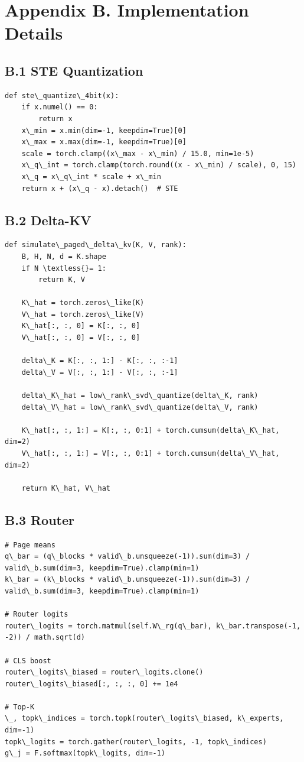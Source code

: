 \section{Appendix B. Implementation Details}

\subsection{B.1 STE Quantization}

\begin{lstlisting}
def ste\_quantize\_4bit(x):
    if x.numel() == 0:
        return x
    x\_min = x.min(dim=-1, keepdim=True)[0]
    x\_max = x.max(dim=-1, keepdim=True)[0]
    scale = torch.clamp((x\_max - x\_min) / 15.0, min=1e-5)
    x\_q\_int = torch.clamp(torch.round((x - x\_min) / scale), 0, 15)
    x\_q = x\_q\_int * scale + x\_min
    return x + (x\_q - x).detach()  # STE
\end{lstlisting}

\subsection{B.2 Delta-KV}

\begin{lstlisting}
def simulate\_paged\_delta\_kv(K, V, rank):
    B, H, N, d = K.shape
    if N \textless{}= 1:
        return K, V
    
    K\_hat = torch.zeros\_like(K)
    V\_hat = torch.zeros\_like(V)
    K\_hat[:, :, 0] = K[:, :, 0]
    V\_hat[:, :, 0] = V[:, :, 0]
    
    delta\_K = K[:, :, 1:] - K[:, :, :-1]
    delta\_V = V[:, :, 1:] - V[:, :, :-1]
    
    delta\_K\_hat = low\_rank\_svd\_quantize(delta\_K, rank)
    delta\_V\_hat = low\_rank\_svd\_quantize(delta\_V, rank)
    
    K\_hat[:, :, 1:] = K[:, :, 0:1] + torch.cumsum(delta\_K\_hat, dim=2)
    V\_hat[:, :, 1:] = V[:, :, 0:1] + torch.cumsum(delta\_V\_hat, dim=2)
    
    return K\_hat, V\_hat
\end{lstlisting}

\subsection{B.3 Router}

\begin{lstlisting}
# Page means
q\_bar = (q\_blocks * valid\_b.unsqueeze(-1)).sum(dim=3) / valid\_b.sum(dim=3, keepdim=True).clamp(min=1)
k\_bar = (k\_blocks * valid\_b.unsqueeze(-1)).sum(dim=3) / valid\_b.sum(dim=3, keepdim=True).clamp(min=1)

# Router logits
router\_logits = torch.matmul(self.W\_rg(q\_bar), k\_bar.transpose(-1, -2)) / math.sqrt(d)

# CLS boost
router\_logits\_biased = router\_logits.clone()
router\_logits\_biased[:, :, :, 0] += 1e4

# Top-K
\_, topk\_indices = torch.topk(router\_logits\_biased, k\_experts, dim=-1)
topk\_logits = torch.gather(router\_logits, -1, topk\_indices)
g\_j = F.softmax(topk\_logits, dim=-1)
\end{lstlisting}

